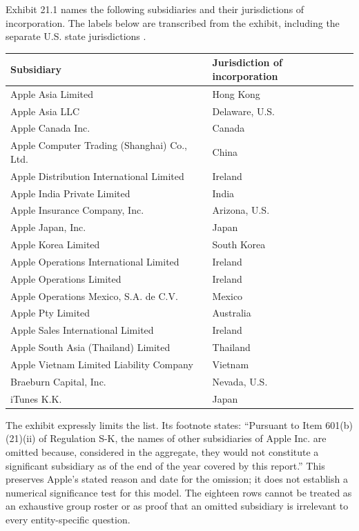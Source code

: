 Exhibit 21.1 names the following subsidiaries and their jurisdictions of
incorporation. The labels below are transcribed from the exhibit, including
the separate U.S. state jurisdictions \citep[Exhibit 21.1, retained PDF p.~114]{apple2024}.
\begin{center}
\small
\begin{tabular}{ll}
\toprule
Subsidiary & Jurisdiction of incorporation\\\midrule
Apple Asia Limited & Hong Kong\\
Apple Asia LLC & Delaware, U.S.\\
Apple Canada Inc. & Canada\\
Apple Computer Trading (Shanghai) Co., Ltd. & China\\
Apple Distribution International Limited & Ireland\\
Apple India Private Limited & India\\
Apple Insurance Company, Inc. & Arizona, U.S.\\
Apple Japan, Inc. & Japan\\
Apple Korea Limited & South Korea\\
Apple Operations International Limited & Ireland\\
Apple Operations Limited & Ireland\\
Apple Operations Mexico, S.A. de C.V. & Mexico\\
Apple Pty Limited & Australia\\
Apple Sales International Limited & Ireland\\
Apple South Asia (Thailand) Limited & Thailand\\
Apple Vietnam Limited Liability Company & Vietnam\\
Braeburn Capital, Inc. & Nevada, U.S.\\
iTunes K.K. & Japan\\\bottomrule
\end{tabular}
\end{center}

The exhibit expressly limits the list. Its footnote states: ``Pursuant to
Item 601(b)(21)(ii) of Regulation S-K, the names of other subsidiaries of Apple
Inc. are omitted because, considered in the aggregate, they would not
constitute a significant subsidiary as of the end of the year covered by this
report.'' This preserves Apple's stated reason and date for the omission;
it does not establish a numerical significance test for this model. The
eighteen rows cannot be treated as an exhaustive group roster or as proof that
an omitted subsidiary is irrelevant to every entity-specific question.

